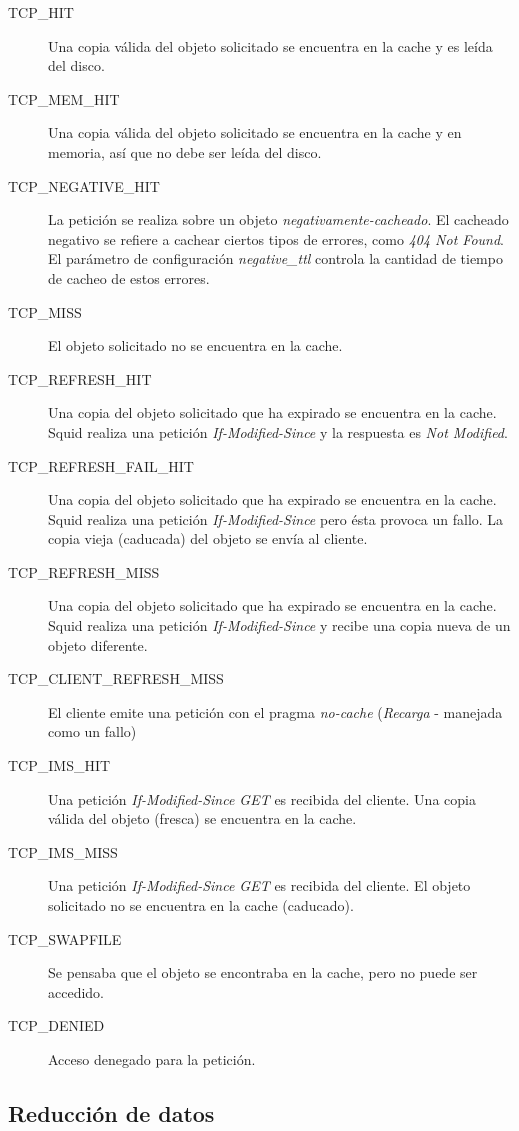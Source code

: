 \documentclass[twocolumn]{Jornadas}
\begin{document}
\begin{description}
\item[TCP\_HIT] Una copia válida del objeto solicitado se encuentra en la cache y es leída del disco.
\item[TCP\_MEM\_HIT] Una copia válida del objeto solicitado se encuentra en la cache y en memoria, así que no debe ser leída del disco.
\item[TCP\_NEGATIVE\_HIT] La petición se realiza sobre un objeto \emph{negativamente-cacheado}. El cacheado negativo se refiere a cachear ciertos tipos de errores, como \emph{404 Not Found}. El parámetro de configuración \emph{negative\_ttl} controla la cantidad de tiempo de cacheo de estos errores.
\item[TCP\_MISS] El objeto solicitado no se encuentra en la cache.
\item[TCP\_REFRESH\_HIT] Una copia del objeto solicitado que ha expirado se encuentra en la cache. Squid realiza una petición \emph{If-Modified-Since} y la respuesta es \emph{Not Modified}.
\item[TCP\_REFRESH\_FAIL\_HIT] Una copia del objeto solicitado que ha expirado se encuentra en la cache. Squid realiza una petición \emph{If-Modified-Since} pero ésta provoca un fallo. La copia vieja (caducada) del objeto se envía al cliente.
\item[TCP\_REFRESH\_MISS] Una copia del objeto solicitado que ha expirado se encuentra en la cache. Squid realiza una petición \emph{If-Modified-Since} y recibe una copia nueva de un objeto diferente.
\item[TCP\_CLIENT\_REFRESH\_MISS] El cliente emite una petición con el pragma \emph{no-cache} (\emph{Recarga} - manejada como un fallo)
\item[TCP\_IMS\_HIT] Una petición \emph{If-Modified-Since GET} es recibida del cliente. Una copia válida del objeto (fresca) se encuentra en la cache.
\item[TCP\_IMS\_MISS] Una petición \emph{If-Modified-Since GET} es recibida del cliente. El objeto solicitado no se encuentra en la cache (caducado).
\item[TCP\_SWAPFILE] Se pensaba que el objeto se encontraba en la cache, pero no puede ser accedido.
\item[TCP\_DENIED] Acceso denegado para la petición.
\end{description}

\subsection{Reducción de datos}
\label{red_datos}
\end{document}
